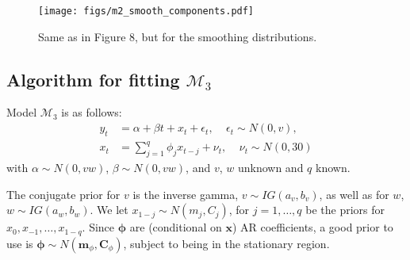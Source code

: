 \documentclass[12pt]{article}
\newcommand{\m}[1]{\mathbf{\bm{#1}}}
\begin{document}
\begin{figure}[H]
\begin{center}
\texttt{[image: figs/m2\_smooth\_components.pdf]}
\end{center}
\caption{Same as in Figure 8, but for the smoothing distributions.}
\end{figure}

\newpage

\subsection*{Algorithm for fitting $\mathcal{M}_3$}

\noindent Model $\mathcal{M}_3$ is as follows:
\begin{align*}
y_t &= \alpha + \beta t + x_t + \epsilon_t,~~~~~\epsilon_t \sim N(0, v), \\
x_t &= \sum_{j=1}^q\phi_j x_{t-j} + \nu_t,~~~~~\nu_t \sim N(0, 30)
\end{align*}
\noindent with $\alpha \sim N(0, vw)$, $\beta\sim N(0, vw)$, and $v$, $w$ unknown and $q$ known.
\bigskip

\noindent The conjugate prior for $v$ is the inverse gamma, $v\sim IG(a_v, b_v)$, as well as for $w$, $w\sim IG(a_w, b_w)$. We let $x_{1-j}\sim N(m_j, C_j)$, for $j=1,\ldots,q$ be the priors for $x_0,x_{-1},\ldots,x_{1-q}$. Since $\m{\phi}$ are (conditional on $\m{x}$) AR coefficients, a good prior to use is $\m{\phi}\sim N(\m{m}_\phi, \m{C}_\phi)$, subject to being in the stationary region.
\bigskip
\end{document}
